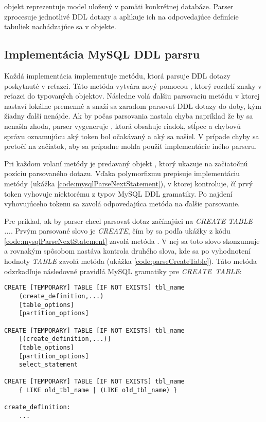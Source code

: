  objekt reprezentuje model uložený v pamäti konkrétnej databáze. Parser zprocesuje jednotlivé DDL dotazy a aplikuje ich na odpovedajúce definície tabuliek nachádzajúce sa v  objekte.

\subsection{Implementácia MySQL DDL parsru}
Každá implementácia  implementuje metódu, ktorá parsuje DDL dotazy poskytnuté v reťazci. Táto metóda vytvára nový  pomocou , ktorý rozdelí znaky v reťazci do typovaných  objektov. Následne volá ďalšiu parsovaciu metódu v ktorej nastaví lokálne premenné a snaží sa zaradom parsovať DDL dotazy do doby, kým žíadny ďalší nenájde. Ak by počas parsovania nastala chyba napríklad že by sa nenašla zhoda, parser vygeneruje , ktorá obsahuje riadok, stĺpec a chybovú správu oznamujúcu aký token bol očakávaný a aký sa našiel. V prípade chyby sa  pretočí na začiatok, aby sa prípadne mohla použiť implementácie iného parseru.

Pri každom volaní metódy  je predavaný objekt , ktorý ukazuje na začiatočnú pozíciu parsovaného dotazu. Vďaka polymorfizmu  prepisuje implementáciu  metódy (ukážka \ref{code:mysqlParseNextStatement}), v ktorej kontroluje, čí prvý token vyhovuje niektorému z typov MySQL DDL gramatiky. Po najdení vyhovujúceho tokenu sa zavolá odpovedajúca metóda na ďalšie parsovanie. 

Pre príklad, ak by parser chcel parsovať dotaz začínajúci na \textit{CREATE TABLE ...}. Prvým parsované slovo je \textit{CREATE}, čím by sa podľa ukážky z kódu \ref{code:mysqlParseNextStatement} zavolá metóda . V nej sa toto slovo skonzumuje a rovnakým spôsobom nastáva kontrola druhého slova, kde sa po vyhodnotení hodnoty \textit{TABLE} zavolá metóda  (ukážka \ref{code:parseCreateTable}). Táto metóda odzrkadľuje následovné pravidlá MySQL gramatiky pre \mbox{\textit{CREATE TABLE}}:
\newline
\begin{lstlisting}[language=MySQL, frame=none, numbers=none]
CREATE [TEMPORARY] TABLE [IF NOT EXISTS] tbl_name
    (create_definition,...)
    [table_options]
    [partition_options]

CREATE [TEMPORARY] TABLE [IF NOT EXISTS] tbl_name
    [(create_definition,...)]
    [table_options]
    [partition_options]
    select_statement

CREATE [TEMPORARY] TABLE [IF NOT EXISTS] tbl_name
    { LIKE old_tbl_name | (LIKE old_tbl_name) }

create_definition:
    ...
\end{lstlisting}

